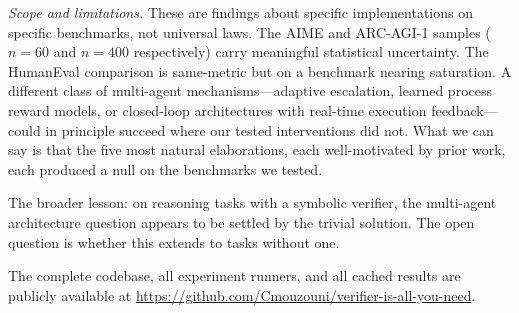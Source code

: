 \documentclass[11pt]{amsart}
\newcommand\1{{\mathds{1}}}
\theoremstyle{definition}
\theoremstyle{remark}
\numberwithin{equation}{section}
\begin{document}
\emph{Scope and limitations.}
These are findings about specific implementations on specific benchmarks, not universal laws.
The AIME and ARC-AGI-1 samples ($n = 60$ and $n = 400$ respectively) carry meaningful statistical uncertainty.
The HumanEval comparison is same-metric but on a benchmark nearing saturation.
A different class of multi-agent mechanisms---adaptive escalation, learned process reward models, or closed-loop architectures with real-time execution feedback---could in principle succeed where our tested interventions did not.
What we can say is that the five most natural elaborations, each well-motivated by prior work, each produced a null on the benchmarks we tested.

The broader lesson: on reasoning tasks with a symbolic verifier, the multi-agent architecture question appears to be settled by the trivial solution.
The open question is whether this extends to tasks without one.

The complete codebase, all experiment runners, and all cached results are publicly available at \url{https://github.com/Cmouzouni/verifier-is-all-you-need}.
\end{document}
